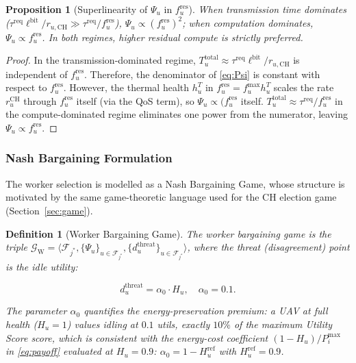 \documentclass[journal]{IEEEtran}
\newtheorem{definition}{Definition}
\newtheorem{proposition}{Proposition}
\begin{document}
\begin{IEEEproof}
\begin{proposition}[Superlinearity of $\Psi_{u}$ in
$f_{u}^{\mathrm{res}}$]\label{prop:super}
When transmission time dominates
($\tau^{\mathrm{req}}\ell^{\mathrm{bit}}/r_{u,\mathrm{CH}}
\gg\tau^{\mathrm{req}}/f_{u}^{\mathrm{res}}$),
$\Psi_{u}\propto(f_{u}^{\mathrm{res}})^{2}$;
when computation dominates,
$\Psi_{u}\propto f_{u}^{\mathrm{res}}$.
In both regimes, higher residual compute is strictly
preferred.
\end{proposition}
\begin{proof}
In the transmission-dominated regime, $T_{u}^{\mathrm{total}}\approx\tau^{\mathrm{req}}\ell^{\mathrm{bit}}/r_{u,\mathrm{CH}}$ is independent of $f_{u}^{\mathrm{res}}$. Therefore, the denominator of \eqref{eq:Psi} is constant with respect to $f_{u}^{\mathrm{res}}$. However, the thermal health $h_{u}^{T}$ in $f_{u}^{\mathrm{res}}=f_{u}^{\max}h_{u}^{T}$ scales the rate $r_{u}^{\mathrm{CH}}$ through $f_{u}^{\mathrm{res}}$ itself (via the QoS term), so $\Psi_{u}\propto(f_{u}^{\mathrm{res}}$ itself.  $T_{u}^{\mathrm{total}}\approx\tau^{\mathrm{req}}/f_{u}^{\mathrm{res}}$ in the compute-dominated regime eliminates one power from the numerator, leaving $\Psi_{u}\propto f_{u}^{\mathrm{res}}$.
\end{proof}

\subsubsection{Nash Bargaining Formulation}

The worker selection is modelled as a Nash Bargaining
Game, whose structure is motivated by the same
game-theoretic language used for the CH election game
(Section~\ref{sec:game}).

\begin{definition}[Worker Bargaining Game]\label{def:worker_game}
The worker bargaining game is the triple
$\mathcal{G}_{\mathrm{W}}
=\langle\mathcal{F}_{j^{*}},
\{\Psi_{u}\}_{u\in\mathcal{F}_{j^{*}}},
\{d_{u}^{\mathrm{threat}}\}_{u\in\mathcal{F}_{j^{*}}}\rangle$,
where the \emph{threat (disagreement) point} is the
idle utility:

\begin{equation}\label{eq:threat}
  d_{u}^{\mathrm{threat}}=\alpha_{0}\cdot H_{u},
  \quad\alpha_{0}=0.1.
\end{equation}

The parameter $\alpha_{0}$ quantifies the
\emph{energy-preservation premium}: a UAV at full health
($H_{u}=1$) values idling at $0.1$ utils, exactly $10\%$
of the maximum Utility Score score, which is consistent with the
energy-cost coefficient $(1-H_{u})/P_{i}^{\max}$ in
\eqref{eq:payoff} evaluated at $H_{u}=0.9$:
$\alpha_{0}=1-H_{u}^{\mathrm{ref}}$ with
$H_{u}^{\mathrm{ref}}=0.9$.
\end{definition}


\end{IEEEproof}
\end{document}
